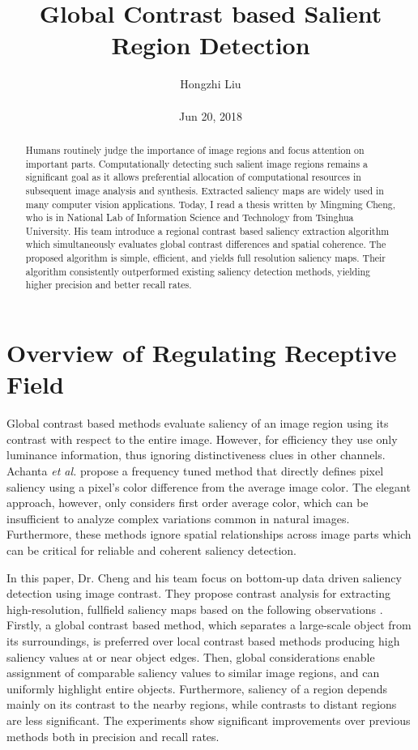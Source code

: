 \documentclass[10pt,twocolumn,letterpaper]{article}
\title{Global Contrast based Salient Region Detection}
\author{Hongzhi Liu\\\\
Jun 20, 2018}
\begin{document}
\maketitle
\begin{abstract}
	Humans routinely judge the importance of image regions and focus attention on important parts. Computationally detecting such salient image regions remains a significant goal as it allows preferential allocation of computational resources in subsequent image analysis and synthesis. Extracted saliency maps are widely used in many computer vision applications. Today, I read a thesis written by Mingming Cheng, who is in National Lab of Information Science and Technology from Tsinghua University. His team introduce a regional contrast based saliency extraction algorithm which simultaneously evaluates global contrast differences and spatial coherence. The proposed algorithm is simple, efficient, and yields full resolution saliency maps. Their algorithm consistently outperformed existing saliency detection methods, yielding higher precision and better recall rates.
\end{abstract}
\section{Overview of Regulating Receptive Field}

Global contrast based methods evaluate saliency of an image region using its contrast with respect to the entire image. However, for efficiency they use only luminance information, thus ignoring distinctiveness clues in other channels. Achanta \emph{et al.} \cite{Achanta2009Frequency} propose a frequency tuned method that directly defines pixel saliency using a pixel's color difference from the average image color. The elegant approach, however, only considers first order average color, which can be insufficient to analyze complex variations common in natural images. Furthermore, these methods ignore spatial relationships across image parts which can be critical for reliable and coherent saliency detection.

In this paper, Dr. Cheng and his team focus on bottom-up data driven saliency detection using image contrast. They propose contrast analysis for extracting high-resolution, fullfield saliency maps based on the following observations \cite{Cheng2011Global}. Firstly, a global contrast based method, which separates a large-scale object from its surroundings, is preferred over local contrast based methods producing high saliency values at or near object edges. Then, global considerations enable assignment of comparable saliency values to similar image regions, and can uniformly highlight entire objects. Furthermore, saliency of a region depends mainly on its contrast to the nearby regions, while contrasts to distant regions are less significant. The experiments show significant improvements over previous methods both in precision and recall rates.
\end{document}
